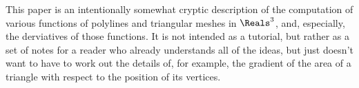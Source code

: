 \label{sec:Introduction}

This paper is an intentionally somewhat cryptic description
of the computation of various functions of polylines
and triangular meshes in $\Reals^3$,
and, especially, the derviatives of those functions.
It is not intended as a tutorial,
but rather as a set of notes for a reader who
already understands all of the ideas,
but just doesn't want to have to work out the
details of, for example, the gradient of the
area of a triangle with respect 
to the position of its vertices.

